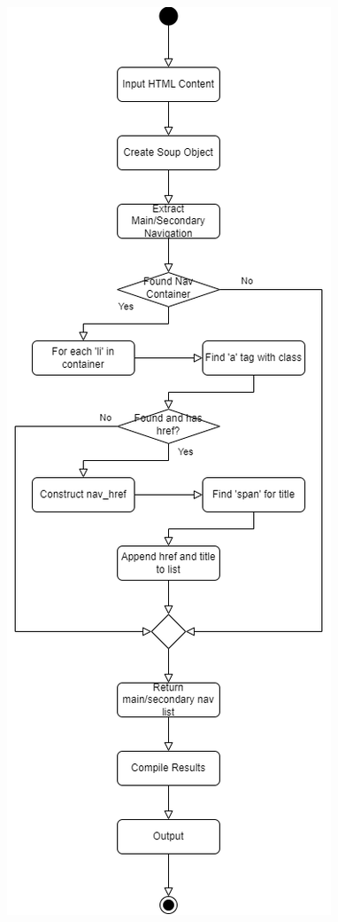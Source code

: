 \documentclass[10pt]{article}
\begin{document}
\begin{figure}[htbp]
    \centering
    \begin{minipage}[t]{0.35\textwidth}
        \includegraphics[width=\textwidth]{../FlowChart_Navbar.png}

\end{minipage}
\end{figure}
\end{document}
